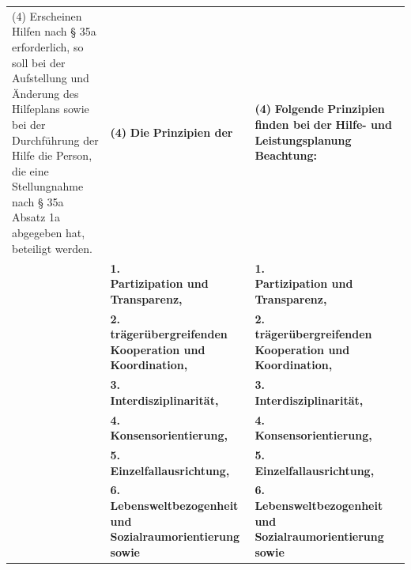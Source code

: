 \documentclass[10pt,a4paper,landscape]{article}
\begin{document}
\begin{longtable}{|L{8.2cm}|L{8.2cm}|L{8.2cm}|}
(4) \textcolor{diffred}{Erscheinen Hilfen nach \S{} 35a  \newline erforderlich, so soll} bei der \textcolor{diffred}{Aufstellung} und  \newline \textcolor{diffred}{Änderung des Hilfeplans sowie bei der  \newline Durchführung der Hilfe die Person, die eine  \newline Stellungnahme nach \S{} 35a Absatz 1a  \newline abgegeben hat, beteiligt werden.} & \textbf{(4) }\textbf{\textcolor{diffred}{Die}}\textbf{ Prinzipien der} & \textbf{(4) }\textbf{\textcolor{diffgreen}{Folgende}}\textbf{ Prinzipien }\textbf{\textcolor{diffgreen}{finden bei}}\textbf{ der} \newline \textbf{\textcolor{diffgreen}{Hilfe- und Leistungsplanung Beachtung:}} \\
\hhline{|---|}
 & \textbf{1.   \newline Partizipation und Transparenz, } & \textbf{1.   \newline Partizipation und Transparenz, } \\
\hhline{|---|}
 & \textbf{2.   \newline trägerübergreifenden Kooperation und  \newline Koordination, } & \textbf{2.   \newline trägerübergreifenden Kooperation und  \newline Koordination, } \\
\hhline{|---|}
 & \textbf{3.   \newline Interdisziplinarität, } & \textbf{3.   \newline Interdisziplinarität, } \\
\hhline{|---|}
 & \textbf{4.   \newline Konsensorientierung, } & \textbf{4.   \newline Konsensorientierung, } \\
\hhline{|---|}
 & \textbf{5.   \newline Einzelfallausrichtung, } & \textbf{5.   \newline Einzelfallausrichtung, } \\
\hhline{|---|}
 & \textbf{6.   \newline Lebensweltbezogenheit und  \newline Sozialraumorientierung sowie } & \textbf{6.   \newline Lebensweltbezogenheit und  \newline Sozialraumorientierung sowie } \\

\end{longtable}
\end{document}
